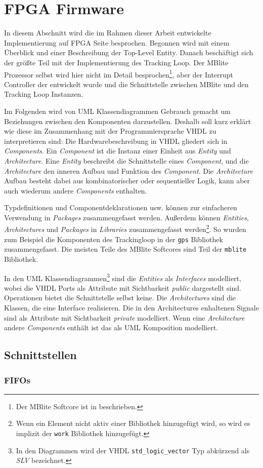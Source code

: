 \section{FPGA Firmware}
In diesem Abschnitt wird die im Rahmen dieser Arbeit entwickelte Implementierung auf FPGA Seite besprochen. Begonnen wird mit einem Überblick und einer Beschreibung der Top-Level Entity. Danach beschäftigt sich der größte Teil mit der Implementierung des Tracking Loop. Der MBlite Prozessor selbst wird hier nicht im Detail besprochen\footnote{Der MBlite Softcore ist in \cite{MBliteThesis} beschrieben.}, aber der Interrupt Controller der entwickelt wurde und die Schnittstelle zwischen MBlite und den Tracking Loop Instanzen.

Im Folgenden wird von UML Klassendiagrammen Gebrauch gemacht um Beziehungen zwischen den Komponenten darzustellen. Deshalb soll kurz erklärt wie diese im Zusammenhang mit der Programmiersprache VHDL zu interpretieren sind: Die Hardwarebeschreibung in VHDL gliedert sich in \emph{Components}. Ein \emph{Component} ist die Instanz einer Einheit aus \emph{Entity} und  \emph{Architecture}. Eine \emph{Entity} beschreibt die Schnittstelle eines \emph{Component}, und die \emph{Architecture} den inneren Aufbau und Funktion des \emph{Component}. Die \emph{Architecture} Aufbau besteht dabei aus kombinatorischer oder sequentieller Logik, kann aber auch wiederum andere \emph{Components} enthalten.

Typdefinitionen und Componentdeklarationen usw. können zur einfacheren Verwendung in \emph{Packages} zusammengefasst werden. Außerdem können \emph{Entities}, \emph{Architectures} und \emph{Packages} in \emph{Libraries} zusammengefasst werden\footnote{Wenn ein Element nicht aktiv einer Bibliothek hinzugefügt wird, so wird es implizit der \lstinline$work$ Bibliothek hinzugefügt.}. So wurden zum Beispiel die Komponenten des Trackingloop in der \lstinline$gps$ Bibliothek zusammengefasst. Die meisten Teile des MBlite Softcores sind Teil der \lstinline$mblite$ Bibliothek.

In den UML Klassendiagrammen\footnote{In den Diagrammen wird der VHDL \lstinline$std_logic_vector$ Typ abkürzend als \emph{SLV} bezeichnet.} sind die \emph{Entities} als  \emph{Interfaces} modelliert, wobei die VHDL Ports als Attribute mit Sichtbarkeit \emph{public} dargestellt sind. Operationen bietet die Schnittstelle selbst keine. Die \emph{Architectures} sind die Klassen, die eine Interface realisieren. Die in den Architectures enhaltenen Signale sind als Attribute mit Sichtbarkeit \emph{private} modelliert. Wenn eine \emph{Architecture} andere \emph{Components} enthält ist das als UML Komposition modelliert.

 
\subsection{Schnittstellen}



\subsubsection{FIFOs}

